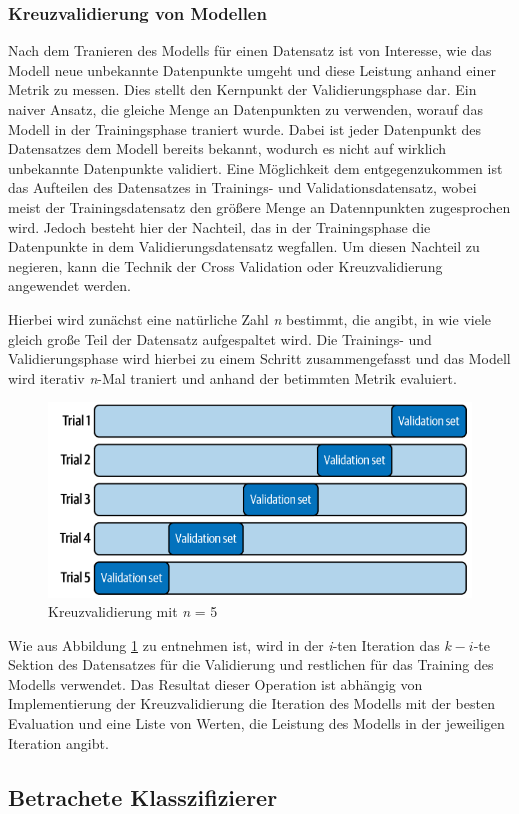 \subsubsection*{Kreuzvalidierung von Modellen}
Nach dem Tranieren des Modells für einen Datensatz ist von Interesse, wie das Modell neue unbekannte Datenpunkte umgeht und diese Leistung anhand einer Metrik zu messen.
Dies stellt den Kernpunkt der Validierungsphase dar. Ein naiver Ansatz, die gleiche Menge an Datenpunkten zu verwenden, worauf das Modell in der Trainingsphase traniert wurde.
Dabei ist jeder Datenpunkt des Datensatzes dem Modell bereits bekannt, wodurch es nicht auf wirklich unbekannte Datenpunkte validiert.
Eine Möglichkeit dem entgegenzukommen ist das Aufteilen des Datensatzes in Trainings- und Validationsdatensatz, wobei meist der Trainingsdatensatz den größere Menge an Datennpunkten zugesprochen wird.
Jedoch besteht hier der Nachteil, das in der Trainingsphase die Datenpunkte in dem Validierungsdatensatz wegfallen.
Um diesen Nachteil zu negieren, kann die Technik der Cross Validation oder Kreuzvalidierung angewendet werden.

Hierbei wird zunächst eine natürliche Zahl \textit{n} bestimmt, die angibt, in wie viele gleich große Teil der Datensatz aufgespaltet wird.
Die Trainings- und Validierungsphase wird hierbei zu einem Schritt zusammengefasst und das Modell wird iterativ \textit{n}-Mal traniert und anhand der betimmten Metrik evaluiert.

\begin{figure}[h]
    \centering
    \includegraphics[scale=0.5]{figures/cross_validation}
    \caption{Kreuzvalidierung mit \textit{n} = 5}
    \label{fig:cross_validation}
\end{figure}
Wie aus Abbildung \ref{fig:cross_validation} zu entnehmen ist, wird in der \textit{i}-ten Iteration das $k-i$-te Sektion des Datensatzes für die Validierung und restlichen
für das Training des Modells verwendet. Das Resultat dieser Operation ist abhängig von Implementierung der Kreuzvalidierung die Iteration des Modells mit der besten Evaluation und eine Liste von Werten, die Leistung des Modells in der jeweiligen Iteration angibt.

\subsection{Betrachete Klasszifizierer}